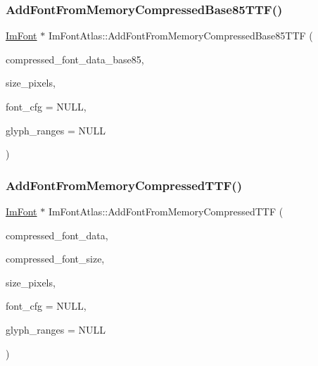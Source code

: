 \mbox{\label{structImFontAtlas_ab43b930beb57c0b998f42f4586677956}} 
\subsubsection{\texorpdfstring{Add\+Font\+From\+Memory\+Compressed\+Base85\+T\+T\+F()}{AddFontFromMemoryCompressedBase85TTF()}}
{\footnotesize\ttfamily \hyperlink{structImFont}{Im\+Font} $\ast$ Im\+Font\+Atlas\+::\+Add\+Font\+From\+Memory\+Compressed\+Base85\+T\+TF (\begin{DoxyParamCaption}\item[{const char $\ast$}]{compressed\+\_\+font\+\_\+data\+\_\+base85,  }\item[{float}]{size\+\_\+pixels,  }\item[{const \hyperlink{structImFontConfig}{Im\+Font\+Config} $\ast$}]{font\+\_\+cfg = {\ttfamily NULL},  }\item[{const Im\+Wchar $\ast$}]{glyph\+\_\+ranges = {\ttfamily NULL} }\end{DoxyParamCaption})}

\mbox{\label{structImFontAtlas_a579bb434bd116ea9ac4f892652ccefdb}} 
\subsubsection{\texorpdfstring{Add\+Font\+From\+Memory\+Compressed\+T\+T\+F()}{AddFontFromMemoryCompressedTTF()}}
{\footnotesize\ttfamily \hyperlink{structImFont}{Im\+Font} $\ast$ Im\+Font\+Atlas\+::\+Add\+Font\+From\+Memory\+Compressed\+T\+TF (\begin{DoxyParamCaption}\item[{const \hyperlink{imgui__impl__opengl3__loader_8h_ac668e7cffd9e2e9cfee428b9b2f34fa7}{void} $\ast$}]{compressed\+\_\+font\+\_\+data,  }\item[{int}]{compressed\+\_\+font\+\_\+size,  }\item[{float}]{size\+\_\+pixels,  }\item[{const \hyperlink{structImFontConfig}{Im\+Font\+Config} $\ast$}]{font\+\_\+cfg = {\ttfamily NULL},  }\item[{const Im\+Wchar $\ast$}]{glyph\+\_\+ranges = {\ttfamily NULL} }\end{DoxyParamCaption})}


